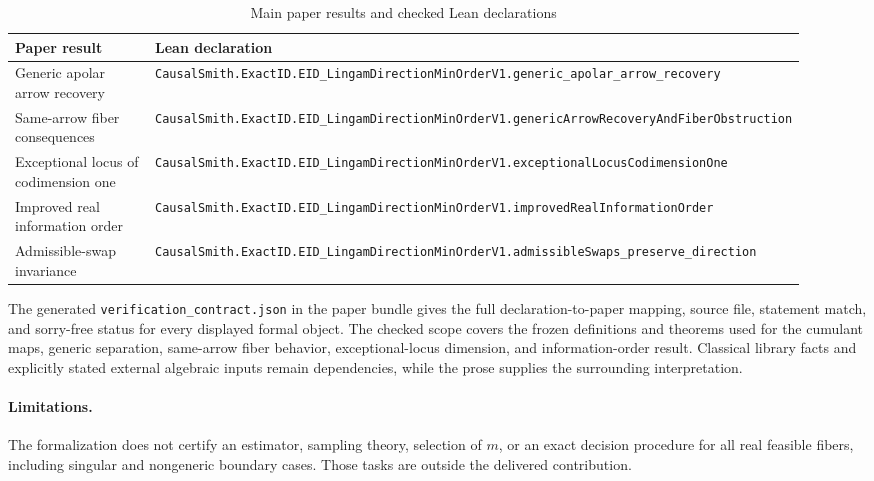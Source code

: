 \begin{table}[ht]
\centering
\scriptsize
\caption{Main paper results and checked Lean declarations}
\begin{tabular}{p{0.30\linewidth}p{0.62\linewidth}}
\hline
Paper result & Lean declaration \\
\hline
Generic apolar arrow recovery &
\texttt{CausalSmith.ExactID.EID\_LingamDirectionMinOrderV1.generic\_apolar\_arrow\_recovery} \\
Same-arrow fiber consequences &
\texttt{CausalSmith.ExactID.EID\_LingamDirectionMinOrderV1.genericArrowRecoveryAndFiberObstruction} \\
Exceptional locus of codimension one &
\texttt{CausalSmith.ExactID.EID\_LingamDirectionMinOrderV1.exceptionalLocusCodimensionOne} \\
Improved real information order &
\texttt{CausalSmith.ExactID.EID\_LingamDirectionMinOrderV1.improvedRealInformationOrder} \\
Admissible-swap invariance &
\texttt{CausalSmith.ExactID.EID\_LingamDirectionMinOrderV1.admissibleSwaps\_preserve\_direction} \\
\hline
\end{tabular}
\end{table}

The generated \texttt{verification\_contract.json} in the paper bundle gives the full declaration-to-paper mapping, source file, statement match, and sorry-free status for every displayed formal object. The checked scope covers the frozen definitions and theorems used for the cumulant maps, generic separation, same-arrow fiber behavior, exceptional-locus dimension, and information-order result. Classical library facts and explicitly stated external algebraic inputs remain dependencies, while the prose supplies the surrounding interpretation.

\paragraph{Limitations.}
The formalization does not certify an estimator, sampling theory, selection of \(m\), or an exact decision procedure for all real feasible fibers, including singular and nongeneric boundary cases. Those tasks are outside the delivered contribution.
